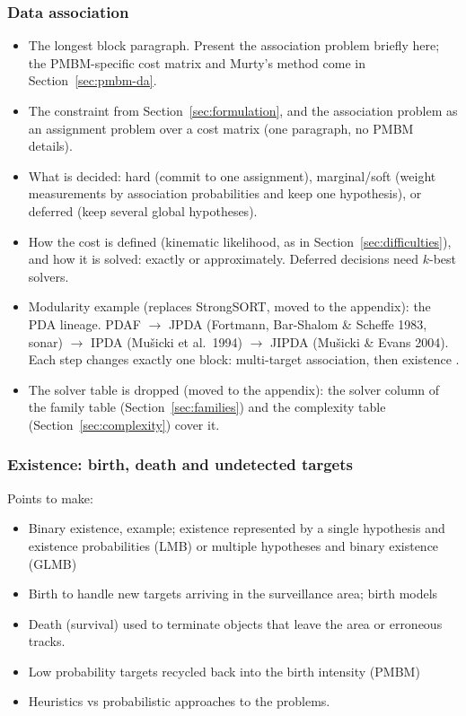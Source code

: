 \subsubsection{Data association}
\label{sec:anatomy-da}
\begin{itemize}
    \item The longest block paragraph. Present the association problem briefly here; the PMBM-specific cost matrix and Murty's method come in Section~\ref{sec:pmbm-da}.
    \item The constraint from Section~\ref{sec:formulation}, and the association problem as an assignment problem over a cost matrix (one paragraph, no PMBM details).
    \item What is decided: hard (commit to one assignment), marginal/soft (weight measurements by association probabilities and keep one hypothesis), or deferred (keep several global hypotheses).
    \item How the cost is defined (kinematic likelihood, as in Section~\ref{sec:difficulties}), and how it is solved: exactly or approximately. Deferred decisions need $k$-best solvers.
    \item Modularity example (replaces StrongSORT, moved to the appendix): the PDA lineage. PDAF $\rightarrow$ JPDA (Fortmann, Bar-Shalom \& Scheffe 1983, sonar) $\rightarrow$ IPDA (Mu\v{s}icki et al.\ 1994) $\rightarrow$ JIPDA (Mu\v{s}icki \& Evans 2004). Each step changes exactly one block: multi-target association, then existence .
    \item The solver table is dropped (moved to the appendix): the solver column of the family table (Section~\ref{sec:families}) and the complexity table (Section~\ref{sec:complexity}) cover it.
\end{itemize}


\subsubsection{Existence: birth, death and undetected targets}
\label{sec:anatomy-existence}
Points to make:
\begin{itemize}
    \item Binary existence, example; existence represented by a single hypothesis and existence probabilities (LMB) or multiple hypotheses and binary existence (GLMB)
    \item Birth to handle new targets arriving in the surveillance area; birth models
    \item Death (survival) used to terminate objects that leave the area or erroneous tracks.
    \item Low probability targets recycled back into the birth intensity (PMBM)
    \item Heuristics vs probabilistic approaches to the problems.
\end{itemize}

